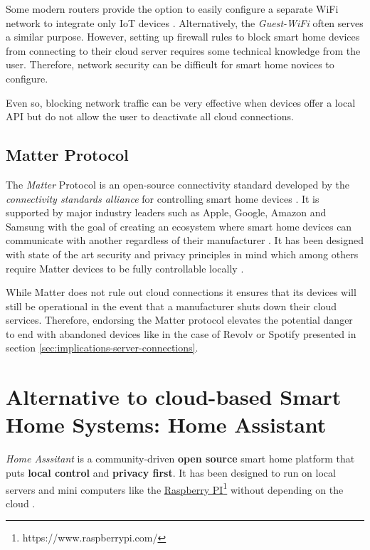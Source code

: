 Some modern routers provide the option to easily configure a separate WiFi network to integrate only IoT devices \cite{BMI-SmartHomeSecurity}. Alternatively, the \textit{Guest-WiFi} often serves a similar purpose. However, setting up firewall rules to block smart home devices from connecting to their cloud server requires some technical knowledge from the user. Therefore, network security can be difficult for smart home novices to configure.

Even so, blocking network traffic can be very effective when devices offer a local API but do not allow the user to deactivate all cloud connections.

\subsection{Matter Protocol}
The \textit{Matter} Protocol is an open-source connectivity standard developed by the \textit{connectivity standards alliance} for controlling smart home devices \cite{Matter-Security&Privacy}. It is supported by major industry leaders such as Apple, Google, Amazon and Samsung with the goal of creating an ecosystem where smart home devices can communicate with another regardless of their manufacturer \cite{Matter-10288747}. It has been designed with state of the art security and privacy principles in mind which among others require Matter devices to be fully controllable locally \cite{Matter-Security&Privacy}.

While Matter does not rule out cloud connections \cite{Matter-Security&Privacy} it ensures that its devices will still be operational in the event that a manufacturer shuts down their cloud services. Therefore, endorsing the Matter protocol elevates the potential danger to end with abandoned devices like in the case of Revolv or Spotify presented in section \ref{sec:implications-server-connections}.

\newpage


\section{Alternative to cloud-based Smart Home Systems: Home Assistant} \label{sec:Home Assistant}
\textit{Home Asssitant} is a community-driven \textbf{open source} smart home platform that puts \textbf{local control} and \textbf{privacy first}. It has been designed to run on local servers and mini computers like the \href{https://www.raspberrypi.com/}{Raspberry PI}\footnote{https://www.raspberrypi.com/} without depending on the cloud \cite{HomeAssistant_Startpage}.

